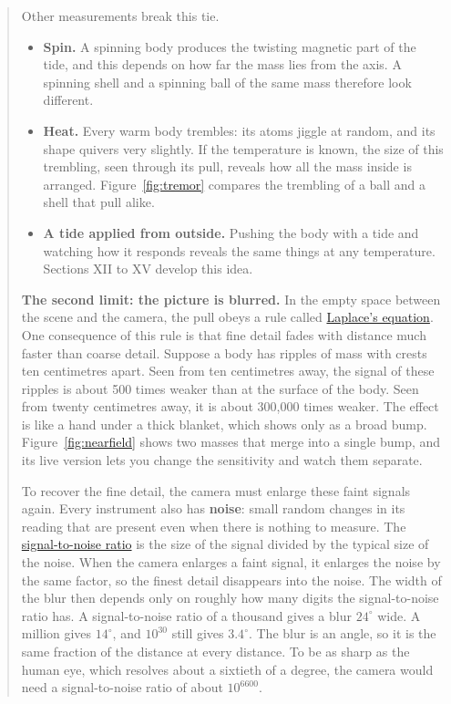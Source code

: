 \begin{quote}
Other measurements break this tie.
\begin{itemize}
\item \textbf{Spin.} A spinning body produces the twisting magnetic part of the
tide, and this depends on how far the mass lies from the axis. A spinning shell
and a spinning ball of the same mass therefore look different.
\item \textbf{Heat.} Every warm body trembles: its atoms jiggle at random, and
its shape quivers very slightly. If the temperature is known, the size of this
trembling, seen through its pull, reveals how all the mass inside is
arranged. Figure~\ref{fig:tremor} compares the trembling of a ball and a shell that pull alike.
\item \textbf{A tide applied from outside.} Pushing the body with a tide and
watching how it responds reveals the same things at any temperature. Sections
XII to XV develop this idea.
\end{itemize}

\textbf{The second limit: the picture is blurred.} In the empty space between
the scene and the camera, the pull obeys a rule called
\href{https://en.wikipedia.org/wiki/Laplace's_equation}{Laplace's equation}.
One consequence of this rule is that fine detail fades with distance much
faster than coarse detail. Suppose a body has ripples of mass with crests ten
centimetres apart. Seen from ten centimetres away, the signal of these ripples
is about 500 times weaker than at the surface of the body. Seen from twenty
centimetres away, it is about 300,000 times weaker. The effect is like a hand
under a thick blanket, which shows only as a broad bump. Figure~\ref{fig:nearfield} shows two masses that merge into a single bump, and its live version lets you change the sensitivity and watch them separate.

To recover the fine detail, the camera must enlarge these faint signals again.
Every instrument also has \textbf{noise}: small random changes in its reading
that are present even when there is nothing to measure. The
\href{https://en.wikipedia.org/wiki/Signal-to-noise_ratio}{signal-to-noise
ratio} is the size of the signal divided by the typical size of the noise.
When the camera enlarges a faint signal, it enlarges the noise by the same
factor, so the finest detail disappears into the noise. The width of the blur
then depends only on roughly how many digits the signal-to-noise ratio has. A
signal-to-noise ratio of a thousand gives a blur $24^\circ$ wide. A million
gives $14^\circ$, and $10^{30}$ still gives $3.4^\circ$. The blur is an angle,
so it is the same fraction of the distance at every distance. To be as sharp as
the human eye, which resolves about a sixtieth of a degree, the camera would
need a signal-to-noise ratio of about $10^{6600}$.


\end{quote}
